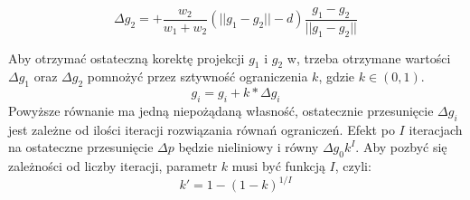$$\Delta g_2 = + \frac{w_2}{w_1 + w_2} (|| g_1 - g_2 || - d)\frac{g_1 -
	g_2}{|| g_1 - g_2 ||}$$

Aby otrzymać ostateczną korektę projekcji $g_1$ i $g_2$ w,
	trzeba otrzymane wartości $\Delta g_1$ oraz $\Delta g_2$ pomnożyć przez
	sztywność ograniczenia $k$, gdzie $k \in (0, 1)$. 
	$$ g_i = g_i + k * \Delta g_i$$
Powyższe równanie ma jedną niepożądaną własność, ostatecznie przesunięcie
$\Delta g_i$ jest zależne od ilości iteracji rozwiązania równań ograniczeń.
Efekt po $I$ iteracjach na ostateczne przesunięcie $\Delta p$ będzie
nieliniowy i równy $\Delta g_0 k^I$. Aby pozbyć się zależności od liczby
iteracji, parametr $k$ musi być funkcją $I$, czyli: $$ k' = 1 - (1 -
		k)^{1/I}$$

